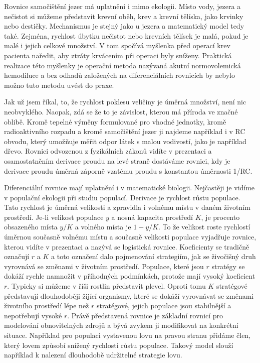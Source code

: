 \documentclass[12pt]{article}
\begin{document}
Rovnice samočištění jezer má uplatnění i mimo ekologii. Místo vody, jezera a nečistot si můžeme představit krevní oběh, krev a krevní tělíska, jako krvinky nebo destičky. Mechanismus je stejný jako u jezera a matematický model tedy také. Zejména, rychlost úbytku nečistot nebo krevních tělísek je malá, pokud je malé i jejich celkové množství. V tom spočívá myšlenka před operací krev pacienta naředit, aby ztráty krvácením při operaci byly sníženy. Praktická realizace této myšlenky je operační metoda nazývaná akutní normovolemická hemodiluce a bez odhadů založených na diferenciálních rovnicích by nebylo možno tuto metodu uvést do praxe.

Jak už jsem říkal, to, že rychlost poklesu veličiny je úměrná množství, není nic neobvyklého. Naopak, zdá se že to je závislost, kterou má příroda ve značné oblibě. Kromě tepelné výměny formulované pro vhodné jednotky, kromě radioaktivního rozpadu a kromě samočištění jezer ji najdeme například i v RC obvodu, který umožňuje měřit odpor látek s malou vodivostí, jako je například dřevo. Rovnici odvozenou z fyzikálních zákonů vidíte v prezentaci a osamostatněním derivace proudu na levé straně dostáváme rovnici, kdy je derivace proudu úměrná záporně vzatému proudu s konstantou úměrnosti 1/RC.

Diferenciální rovnice mají uplatnění i v matematické biologii. Nejčastěji je vidíme v populační ekologii při studiu populací. Derivace je rychlost růstu populace. Tato rychlost je úměrná velikosti a zpravidla i volnému místu v daném životním prostředí. Je-li velikost populace $y$ a nosná kapacita prostředí $K$, je procento obsazeného místa $y/K$ a volného místa je $1-y/K$. To že velikost roste rychlostí úměrnou současně volnému místu a současně velikosti  populace vyjadřuje rovnice, kterou vidíte v prezentaci a nazývá se logistická rovnice. Koeficienty se tradičně označují $r$ a $K$ a toto označení dalo pojmenování strategiím, jak se živočišný druh vyrovnává se změnami v životním prostředí. Populace, které jsou $r$ stratégy se dokáží rychle namnožit v příhodných podmínkách, protože mají vysoký koeficient $r$. Typicky si můžeme v říši rostlin představit plevel. Oproti tomu $K$ stratégové představují dlouhodoběji žijící organismy, které se dokáží vyrovnávat se změnami životního prostředí lépe než $r$ stratégové, jejich populace jsou stabilnější a nepotřebují vysoké $r$. Právě představená rovnice je základní rovnicí pro modelování obnovitelných zdrojů a bývá zvykem ji modifikovat na konkrétní situace. Například pro populaci vystavenou lovu na pravou stranu přidáme člen, který lovem způsobí snížený rychlosti růstu populace. Takový model slouží například k nalezení dlouhodobě udržitelné strategie lovu.
\end{document}
